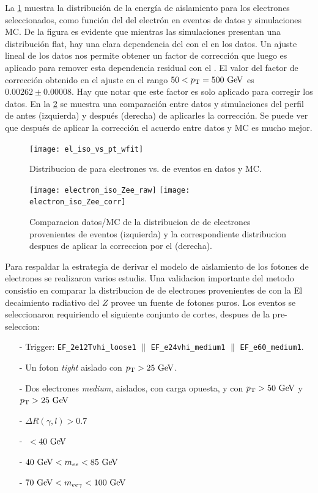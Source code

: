 La \cref{fig:isolation_vs_pt} muestra la distribución de la energía de
aislamiento para los electrones seleccionados, como función del {\pt} del
electrón en eventos de datos y simulaciones MC. De la figura es evidente que
mientras las simulaciones presentan una distribución flat, hay una clara
dependencia del {\etiso} con el {\pt} en los datos. Un ajuste lineal de los
datos nos permite obtener un factor de corrección que luego es aplicado para
remover esta dependencia residual con el \pt. El valor del factor de corrección
obtenido en el ajuste en el rango $50<\pt=500 \gev$ es $0.00262 \pm 0.00008$.
Hay que notar que este factor es solo aplicado para corregir los datos. En la
\cref{fig:isolation_wandwo_correction} se muestra una comparación entre datos y
simulaciones del perfil de {\etiso} antes (izquierda) y después (derecha) de
aplicarles la corrección. Se puede ver que después de aplicar la corrección el
acuerdo entre datos y MC es mucho mejor.

\begin{figure}[h]
  \centering
  \texttt{[image: el\_iso\_vs\_pt\_wfit]}
  \caption{Distribucion de {\etiso} para electrones vs. {\pt} de eventos {\Zee} en datos y MC.}
  \label{fig:isolation_vs_pt}
\end{figure}

\begin{figure}[h]
  \centering
  \texttt{[image: electron\_iso\_Zee\_raw]}
  \texttt{[image: electron\_iso\_Zee\_corr]}
  \caption{Comparacion datos/MC de la distribucion de {\etiso} de electrones provenientes de
    eventos {\Zee} (izquierda) y la correspondiente distribucion despues de aplicar la correccion
    por el {\pt} (derecha).}
  \label{fig:isolation_wandwo_correction}
\end{figure}

Para respaldar la estrategia de derivar el modelo de aislamiento de los fotones de
electrones se realizaron varios estudis. Una validacion importante del metodo consistio
en comparar la distribucion de {\etiso} de electrones provenientes de {\Zee} con la
El decaimiento radiativo del $Z$ provee un fuente de fotones puros. Los eventos se
seleccionaron requiriendo el siguiente conjunto de cortes, despues de la pre-seleccion:

\begin{itemize}\itemsep0.1cm
\item[-] Trigger: \texttt{EF\_2e12Tvhi\_loose1} $\parallel$ \texttt{EF\_e24vhi\_medium1} $\parallel$ \texttt{EF\_e60\_medium1}.
\item[-] Un foton \emph{tight} aislado con $\pt>25 \gev$.
\item[-] Dos electrones \emph{medium}, aislados, con carga opuesta, y con $\pt>50 \gev$ y $\pt>25 \gev$
\item[-] $\Delta R(\gamma,l)>0.7$
\item[-] \MET\ $<40\gev$
\item[-] $40\gev<m_{ee}<85\gev$
\item[-] $70\gev<m_{ee\gamma}<100\gev$
\end{itemize}

